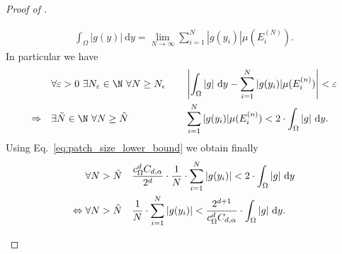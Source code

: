 \documentclass[a4paper, 10pt]{article}
\begin{document}
\begin{proof}[Proof of ]
\begin{itemize}
\begin{align*}
\int_{\Omega} |g(y)| ~ \mathrm{d}y = \lim_{N \rightarrow \infty} \sum_{i=1}^N |g(y_i)| \mu(E_i^{(N)}).
\end{align*}
%
%
%
In particular we have
\begin{alignat*}{2}
&\forall \varepsilon > 0 ~ \exists N_\varepsilon \in \N ~ \forall N \geq N_\epsilon && \quad \left| \int_{\Omega} |g| ~ \mathrm{d}y - \sum_{i=1}^N |g(y_i)| \mu(E_i^{(n)}) \right| < \varepsilon \\
\Rightarrow \quad &\exists \tilde{N} \in \N ~ \forall N \geq \tilde{N}&& \quad \sum_{i=1}^N |g(y_i)| \mu(E_i^{(n)}) < 2 \cdot \int_{\Omega} |g| ~ \mathrm{d}y.
\end{alignat*}
Using Eq.\ \eqref{eq:patch_size_lower_bound} we obtain finally
\begin{align}
\label{eq:desired_estimate}
\forall N > \tilde{N}& \quad \frac{c_\Omega^{d} C_{d, \alpha}}{2^{d}} \cdot \frac{1}{N} \cdot \sum_{i=1}^N |g(y_i)| < 2 \cdot \int_{\Omega} |g| ~ \mathrm{d}y \notag \\
\Leftrightarrow \forall N > \tilde{N}& \quad \frac{1}{N} \cdot \sum_{i=1}^N |g(y_i)| < \frac{2^{d+1}}{c_\Omega^{d} C_{d, \alpha}} \cdot \int_{\Omega} |g| ~ \mathrm{d}y.
\end{align}
\end{itemize}


\end{proof}
\end{document}
